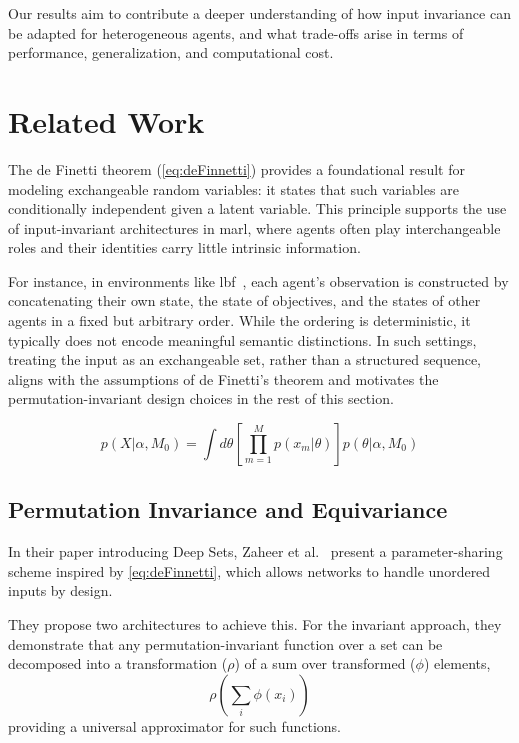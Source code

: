Our results aim to contribute a deeper understanding of how 
input invariance can be adapted for heterogeneous agents, 
and what trade-offs arise in terms of performance, 
generalization, and computational cost.

\section{Related Work}

The de Finetti theorem (\cref{eq:deFinnetti}) provides a foundational 
result for modeling exchangeable random variables: it states that 
such variables are conditionally independent given a latent variable. 
This principle supports the use of input-invariant architectures in 
\gls{marl}, where agents often play interchangeable roles and their 
identities carry little intrinsic information.

For instance, in environments like \gls{lbf}~\cite{papoudakis2021}, 
each agent's observation is constructed by concatenating their own state, 
the state of objectives, and the states of other agents in a fixed but arbitrary order. 
While the ordering is deterministic, it typically does not encode meaningful 
semantic distinctions. In such settings, treating the input as an exchangeable set,
rather than a structured sequence, aligns with the assumptions of de Finetti's theorem 
and motivates the permutation-invariant design choices in the rest of this section.

\begin{equation}
    p(X|\alpha,M_0) =\int d\theta \left[ \prod_{m=1}^{M} p(x_m|\theta)\right]p(\theta|\alpha,M_0)
    \label{eq:deFinnetti}
\end{equation}


\subsection{Permutation Invariance and Equivariance}

In their paper introducing Deep Sets, Zaheer et al.~\cite{zaheer2017} 
present a parameter-sharing scheme inspired by \cref{eq:deFinnetti}, 
which allows networks to handle unordered inputs by design.

They propose two architectures to achieve this.
For the invariant approach, they demonstrate that any 
permutation-invariant function over a set can 
be decomposed into a transformation (\(\rho\)) of a sum over 
transformed (\(\phi\)) elements,
\begin{equation*}
    \rho\left(\sum_i \phi(x_i)\right)
\end{equation*}
providing a universal approximator for such functions. 

